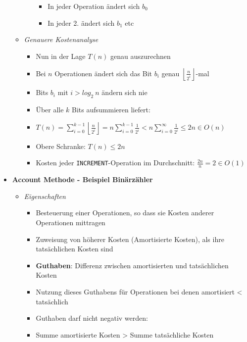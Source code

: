 \begin{itemize}
\begin{itemize}
\begin{itemize}
\begin{minipage}{0.5\textwidth}
\begin{itemize}
                                    \item In jeder Operation ändert sich $b_0$
                                    \item In jeder 2. ändert sich $b_1$ etc
                                \end{itemize}
                            \end{minipage}
                    \end{itemize}
                \item \textit{Genauere Kostenanalyse}
                    \begin{itemize}
                        \item Nun in der Lage $T(n)$ genau auszurechnen
                        \item Bei $n$ Operationen ändert sich das Bit $b_i$ genau $\left \lfloor \frac{n}{2^i} \right \rfloor$-mal
                        \item Bits $b_i$ mit $i > log_2~n$ ändern sich nie
                        \item Über alle $k$ Bits aufsummieren liefert: 
                        \item[] $T(n)= \sum^{k-1}_{i=0} \left \lfloor \frac{n}{2^i} \right \rfloor = n \sum^{k-1}_{i=0} \frac{1}{2^i} 
                                < n \sum^{\infty}_{i=0} \frac{1}{2^i} \leq 2n \in O(n)$
                        \item Obere Schranke: $T(n) \leq 2n$
                        \item Kosten jeder \texttt{INCREMENT}-Operation im Durchschnitt: $\frac{2n}{n} = 2 \in O(1)$
                                
                    \end{itemize}
            \end{itemize}

        \item \textbf{Account Methode - Beispiel Binärzähler}
            \begin{itemize}
                \item \textit{Eigenschaften}
                    \begin{itemize}
                        \item Besteuerung einer Operationen, so dass sie Kosten anderer Operationen mittragen
                        \item Zuweisung von höherer Kosten (Amortisierte Kosten), als ihre tatsächlichen Kosten sind
                        \item \textbf{Guthaben}: Differenz zwischen amortisierten und tatsächlichen Kosten
                        \item Nutzung dieses Guthabens für Operationen bei denen amortisiert < tatsächlich
                        \item Guthaben darf nicht negativ werden:
                        \item[] Summe amortisierte Kosten > Summe tatsächliche Kosten
                    \end{itemize}


\end{itemize}
\end{itemize}
